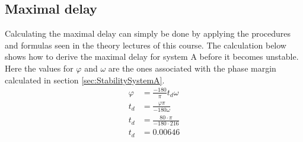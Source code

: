 \documentclass[a4paper,kul]{kulakarticle} %
\begin{document}
		\subsection{Maximal delay}
			\label{sec:MaxDelay}
			Calculating the maximal delay can simply be done by applying the procedures and formulas seen in the theory lectures of this course. The calculation below shows how to derive the maximal delay for system A before it becomes unstable. Here the values for $\varphi$ and $\omega$ are the ones associated with the phase margin calculated in section \ref{sec:StabilitySystemA}. 
			\begin{align*}
				\varphi &=  \frac{-180}{\pi}t_d\omega\\
				t_d &= \frac{\varphi\pi}{-180\omega}\\
				t_d &= \frac{80\cdot\pi}{-180\cdot 216}\\
				t_d &= 0.00646
			\end{align*}
\end{document}
